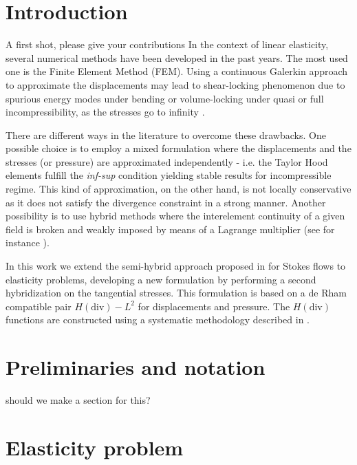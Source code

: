 \documentclass[english,11pt,3p,number,sort&compress]{elsarticle}
\newcommand{\giovane}{\color{red}{\bf\Large GA} \color{cyan} }
\begin{document}
\begin{frontmatter}{}
\end{frontmatter}{}

\section{Introduction}

{\giovane A first shot, please give your contributions}
In the context of linear elasticity, several numerical methods have been developed in the past years. The most used one is the Finite Element Method (FEM). Using a continuous Galerkin approach to approximate the displacements may lead to shear-locking phenomenon due to spurious energy modes under bending \cite{bletzinger2000unified,belytschko1985stress} or volume-locking under quasi or full incompressibility, as the stresses go to infinity \cite{neto2005f,cervera2003mixed}.

There are different ways in the literature to overcome these drawbacks. One possible choice is to employ a mixed formulation \cite{brezzi2012mixed,arnold1988new} where the displacements and the stresses (or pressure) are approximated independently - i.e. the Taylor Hood elements \cite{taylor1973numerical} fulfill the \textit{inf-sup} condition yielding stable results for incompressible regime. This kind of approximation, on the other hand, is not locally conservative as it does not satisfy the divergence constraint in a strong manner. Another possibility is to use hybrid methods where the interelement continuity of a given field is broken and weakly imposed by means of a Lagrange multiplier (see for instance \cite{raviart1977primal,harder2016hybrid,farhloul1997dual}).

In this work we extend the semi-hybrid approach proposed in \cite{carvalho2024semi} for Stokes flows to elasticity problems, developing a new formulation by performing a second hybridization on the tangential stresses. This formulation is based on a de Rham compatible pair $H(\text{div})-L^2$ for displacements and pressure. The $H(\text{div})$ functions are constructed using a systematic methodology described in \cite{devloo2022efficient,de2013new}.


\section{Preliminaries and notation}
{\giovane should we make a section for this?}

\section{Elasticity problem \label{sec:Governing-equations}}
\end{document}
